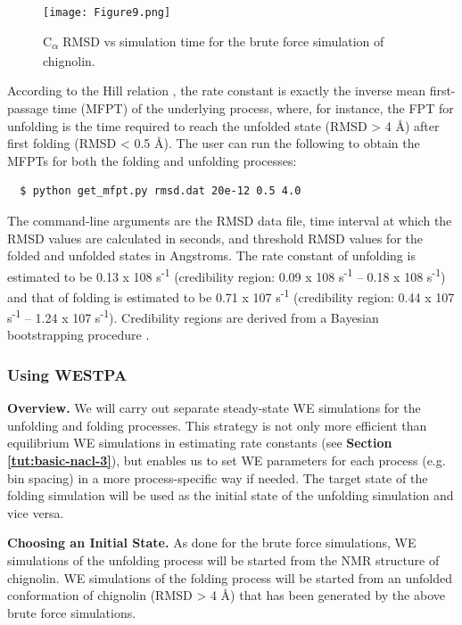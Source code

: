 \begin{figure}
\texttt{[image: Figure9.png]}
\caption{C\textsubscript{$\alpha$} RMSD vs simulation time for the brute force simulation of chignolin.}
\label{fig:chig-rmsd}
\vspace{-0.25cm}
\end{figure}

According to the Hill relation \citep{Hill1989}, the rate constant is exactly the inverse mean first-passage time (MFPT) of the underlying process, where, for instance, the FPT for unfolding is the time required to reach the unfolded state (RMSD > 4 \AA) after first folding (RMSD < 0.5 \AA). 
The user can run the following to obtain the MFPTs for both the folding and unfolding processes: 
\begin{verbatim}
  $ python get_mfpt.py rmsd.dat 20e-12 0.5 4.0
\end{verbatim}

The command-line arguments are the RMSD data file, time interval at which the RMSD values are calculated in seconds, and threshold RMSD values for the folded and unfolded states in Angstroms. 
The rate constant of unfolding is estimated to be 0.13 x 108 s\textsuperscript{-1} (credibility region: 0.09 x 108 s\textsuperscript{-1} – 0.18 x 108 s\textsuperscript{-1}) and that of folding is estimated to be 0.71 x 107 s\textsuperscript{-1} (credibility region: 0.44 x 107 s\textsuperscript{-1} – 1.24 x 107 s\textsuperscript{-1}). 
Credibility regions are derived from a Bayesian bootstrapping procedure \citep{mostofian_statistical_2019}. 

\subsubsection{Using WESTPA}

\textbf{Overview.} We will carry out separate steady-state WE simulations for the unfolding and folding processes. 
This strategy is not only more efficient than equilibrium WE simulations in estimating rate constants (see \textbf{Section \ref{tut:basic-nacl-3}}), but enables us to set WE parameters for each process (e.g. bin spacing) in a more process-specific way if needed. 
The target state of the folding simulation will be used as the initial state of the unfolding simulation and vice versa. 

\textbf{Choosing an Initial State.} As done for the brute force simulations, WE simulations of the unfolding process will be started from the NMR structure of chignolin. 
WE simulations of the folding process will be started from an unfolded conformation of chignolin (RMSD > 4 \AA) that has been generated by the above brute force simulations.
 
